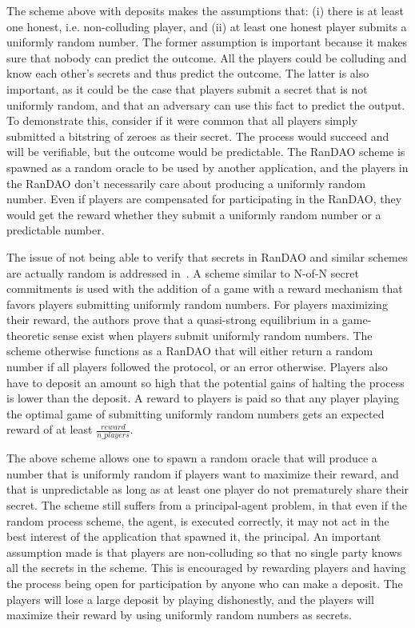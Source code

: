 The scheme above with deposits makes the assumptions that: (i) there is at least one honest, i.e. non-colluding player, and (ii) at least one honest player submits a uniformly random number. The former assumption is important because it makes sure that nobody can predict the outcome. All the players could be colluding and know each other's secrets and thus predict the outcome. The latter is also important, as it could be the case that players submit a secret that is not uniformly random, and that an adversary can use this fact to predict the output. To demonstrate this, consider if it were common that all players simply submitted a bitstring of zeroes as their secret. The process would succeed and will be verifiable, but the outcome would be predictable. The RanDAO scheme is spawned as a random oracle to be used by another application, and the players in the RanDAO don't necessarily care about producing a uniformly random number. Even if players are compensated for participating in the RanDAO, they would get the reward whether they submit a uniformly random number or a predictable number.

The issue of not being able to verify that secrets in RanDAO and similar schemes are actually random is addressed in~\cite{chatterjee_probabilistic_2019}. A scheme similar to N-of-N secret commitments is used with the addition of a game with a reward mechanism that favors players submitting uniformly random numbers. For players maximizing their reward, the authors prove that a quasi-strong equilibrium in a game-theoretic sense exist when players submit uniformly random numbers. The scheme otherwise functions as a RanDAO that will either return a random number if all players followed the protocol, or an error otherwise. Players also have to deposit an amount so high that the potential gains of halting the process is lower than the deposit. A reward to players is paid so that any player playing the optimal game of submitting uniformly random numbers gets an expected reward of at least $\frac{reward}{n\_players}$. 

The above scheme allows one to spawn a random oracle that will produce a number that is uniformly random if players want to maximize their reward, and that is unpredictable as long as at least one player do not prematurely share their secret. The scheme still suffers from a principal-agent problem, in that even if the random process scheme, the agent, is executed correctly, it may not act in the best interest of the application that spawned it, the principal. An important assumption made is that players are non-colluding so that no single party knows all the secrets in the scheme. This is encouraged by rewarding players and having the process being open for participation by anyone who can make a deposit. The players will lose a large deposit by playing dishonestly, and the players will maximize their reward by using uniformly random numbers as secrets.

